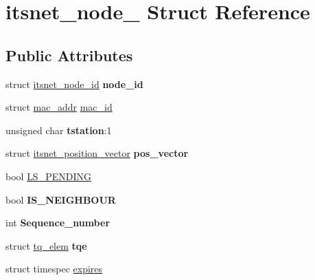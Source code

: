 \hypertarget{structitsnet__node__}{\section{itsnet\-\_\-node\-\_\- \-Struct \-Reference}
\label{structitsnet__node__}
}
\subsection*{\-Public \-Attributes}
\begin{DoxyCompactItemize}
\item 
\hypertarget{structitsnet__node___a41d5133ba8eb209cf111eacc5653066d}{struct \hyperlink{structitsnet__node__id}{itsnet\-\_\-node\-\_\-id} {\bfseries node\-\_\-id}}\label{structitsnet__node___a41d5133ba8eb209cf111eacc5653066d}

\item 
struct \hyperlink{structmac__addr}{mac\-\_\-addr} \hyperlink{structitsnet__node___a5e4d0612d0087ba84e9e6f5bb941d142}{mac\-\_\-id}
\item 
\hypertarget{structitsnet__node___af9660f787f0068da1d6f14af39588221}{unsigned char {\bfseries tstation}\-:1}\label{structitsnet__node___af9660f787f0068da1d6f14af39588221}

\item 
\hypertarget{structitsnet__node___a833d15f9170eb25cd44888111c6503e5}{struct \hyperlink{structitsnet__position__vector}{itsnet\-\_\-position\-\_\-vector} {\bfseries pos\-\_\-vector}}\label{structitsnet__node___a833d15f9170eb25cd44888111c6503e5}

\item 
bool \hyperlink{structitsnet__node___a5948eabb3d13382ca03acd5daaf7892e}{\-L\-S\-\_\-\-P\-E\-N\-D\-I\-N\-G}
\item 
\hypertarget{structitsnet__node___a7637001c02b9bf5d05d43afa0716d815}{bool {\bfseries \-I\-S\-\_\-\-N\-E\-I\-G\-H\-B\-O\-U\-R}}\label{structitsnet__node___a7637001c02b9bf5d05d43afa0716d815}

\item 
\hypertarget{structitsnet__node___a3139611dae28bf3717c45812710c2f33}{int {\bfseries \-Sequence\-\_\-number}}\label{structitsnet__node___a3139611dae28bf3717c45812710c2f33}

\item 
\hypertarget{structitsnet__node___a2f476fcbc461ce20913fd9cd91775d77}{struct \hyperlink{structtq__elem}{tq\-\_\-elem} {\bfseries tqe}}\label{structitsnet__node___a2f476fcbc461ce20913fd9cd91775d77}

\item 
struct timespec \hyperlink{structitsnet__node___a739efa30ffaecf7f432b8b6982741914}{expires}
\end{DoxyCompactItemize}


